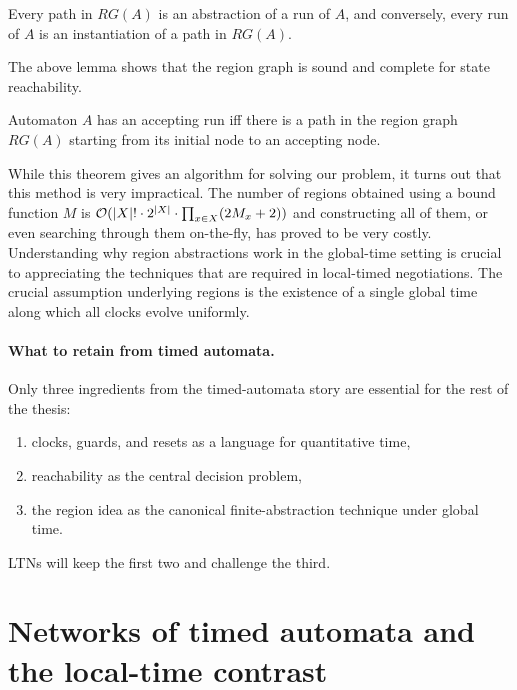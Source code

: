\begin{lemma}
Every path in $RG(A)$ is an abstraction of a run of $A$, and conversely, every run of $A$ is an instantiation of a path in $RG(A)$.
\end{lemma}

The above lemma shows that the region graph is sound and complete for state reachability.

\begin{theorem}[\cite{}]
Automaton $A$ has an accepting run iﬀ there is a path in the region graph $RG(A)$ starting from its initial node to an accepting node.
\end{theorem}

While this theorem gives an algorithm for solving our problem, it turns out that this method is very impractical. The number of regions obtained using a bound function $M$ is ${\mathcal O} (|X|! \cdot 2^{|X|} \cdot \prod_{x \in X} (2M_x + 2))$ \cite{} and constructing all of them, or even searching through them on-the-fly, has proved to be very costly. Understanding why region abstractions work in the global-time setting is crucial to appreciating the techniques that are required in local-timed negotiations. The crucial assumption underlying regions is the existence of a single global time along which all clocks evolve uniformly.

\paragraph{What to retain from timed automata.}
Only three ingredients from the timed-automata story are essential for the rest of the thesis:
\begin{enumerate}
    \item clocks, guards, and resets as a language for quantitative time,
    \item reachability as the central decision problem,
    \item the region idea as the canonical finite-abstraction technique under global time.
\end{enumerate}
LTNs will keep the first two and challenge the third.


\section{Networks of timed automata and the local-time contrast}
\label{sec:prelim-nta}

